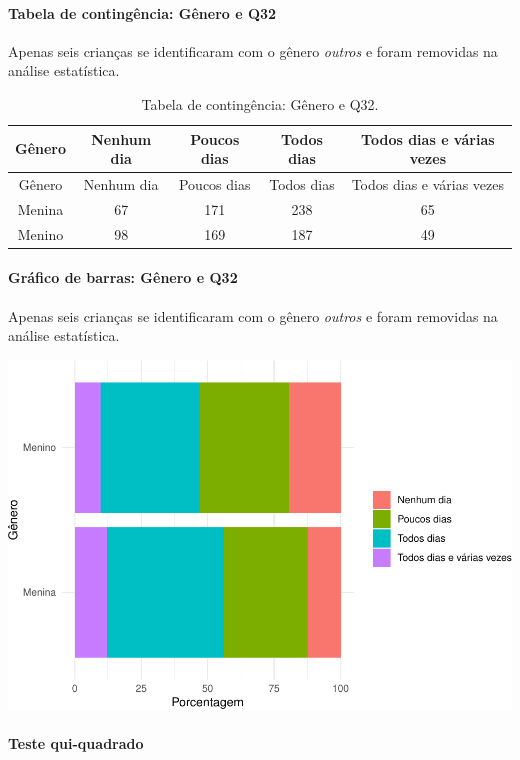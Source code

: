\documentclass[]{article}
\let\oldparagraph\paragraph
\renewcommand{\paragraph}[1]{\oldparagraph{#1}\mbox{}}
\begin{document}
\cleardoublepage

\hypertarget{tabela-de-continguxeancia-guxeanero-e-q32}{%
\paragraph{Tabela de contingência: Gênero e Q32}\label{tabela-de-continguxeancia-guxeanero-e-q32}}

Apenas seis crianças se identificaram com o gênero \emph{outros} e foram removidas na análise estatística.

\begin{longtable}[]{@{}ccccc@{}}
\caption{\label{tab:unnamed-chunk-1085}Tabela de contingência: Gênero e Q32.}\tabularnewline
\toprule
Gênero & Nenhum dia & Poucos dias & Todos dias & Todos dias e várias vezes\tabularnewline
\midrule
\endfirsthead
\toprule
Gênero & Nenhum dia & Poucos dias & Todos dias & Todos dias e várias vezes\tabularnewline
\midrule
\endhead
Menina & 67 & 171 & 238 & 65\tabularnewline
Menino & 98 & 169 & 187 & 49\tabularnewline
\bottomrule
\end{longtable}

\hypertarget{gruxe1fico-de-barras-guxeanero-e-q32}{%
\paragraph{Gráfico de barras: Gênero e Q32}\label{gruxe1fico-de-barras-guxeanero-e-q32}}

Apenas seis crianças se identificaram com o gênero \emph{outros} e foram removidas na análise estatística.

\begin{center}\includegraphics[width=0.75\linewidth]{relatorio_covid19_files/figure-latex/unnamed-chunk-1086-1} \end{center}

\hypertarget{teste-qui-quadrado-93}{%
\paragraph{Teste qui-quadrado}\label{teste-qui-quadrado-93}}
\end{document}
